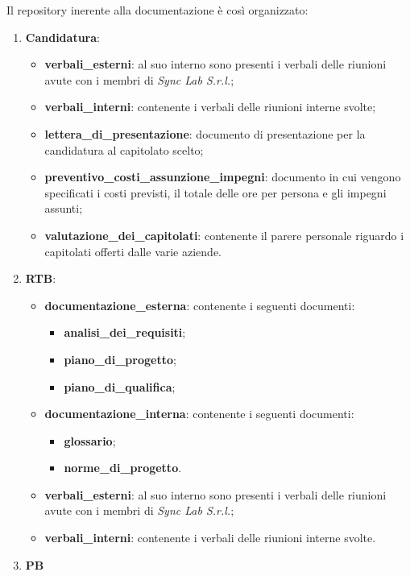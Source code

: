 Il repository inerente alla documentazione è così organizzato:
\begin{enumerate}
	\item \textbf{Candidatura}:
	      \begin{itemize}
		      \item \textbf{verbali\_esterni}: al suo interno sono presenti i verbali delle riunioni avute con i membri di \textit{Sync Lab S.r.l.};
		      \item \textbf{verbali\_interni}: contenente i verbali delle riunioni interne svolte;
		      \item \textbf{lettera\_di\_presentazione}: documento di presentazione per la candidatura al capitolato scelto;
		      \item \textbf{preventivo\_costi\_assunzione\_impegni}: documento in cui vengono specificati i costi previsti, il totale delle ore per persona e gli impegni assunti;
		      \item \textbf{valutazione\_dei\_capitolati}: contenente il parere personale riguardo i capitolati offerti dalle varie aziende.
	      \end{itemize}
	\item \textbf{RTB}:
	      \begin{itemize}
		      \item \textbf{documentazione\_esterna}: contenente i seguenti documenti:
		            \begin{itemize}
			            \item \textbf{analisi\_dei\_requisiti};
			            \item \textbf{piano\_di\_progetto};
			            \item \textbf{piano\_di\_qualifica};
		            \end{itemize}
		      \item \textbf{documentazione\_interna}: contenente i seguenti documenti:
		            \begin{itemize}
			            \item \textbf{glossario};
			            \item \textbf{norme\_di\_progetto}.
		            \end{itemize}
		      \item \textbf{verbali\_esterni}: al suo interno sono presenti i verbali delle riunioni avute con i membri di \textit{Sync Lab S.r.l.};
		      \item \textbf{verbali\_interni}: contenente i verbali delle riunioni interne svolte.
	      \end{itemize}
	\item \textbf{PB} %
\end{enumerate}

